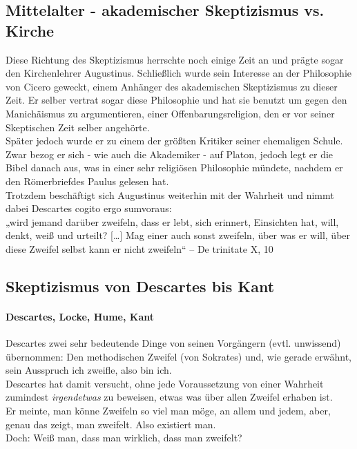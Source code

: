 \documentclass[12pt,a4paper]{article}
\begin{document}
	\subsection{Mittelalter - akademischer Skeptizismus vs. Kirche}
Diese Richtung des Skeptizismus herrschte noch einige Zeit an und prägte sogar den Kirchenlehrer Augustinus. Schließlich wurde sein Interesse an der Philosophie von Cicero geweckt, einem Anhänger des akademischen Skeptizismus zu dieser Zeit. Er selber vertrat sogar diese Philosophie und hat sie benutzt um gegen den Manichäismus zu argumentieren, einer Offenbarungsreligion, den er vor seiner Skeptischen Zeit selber angehörte.\\
Später jedoch wurde er zu einem der größten Kritiker seiner ehemaligen Schule. Zwar bezog er sich - wie auch die Akademiker - auf Platon, jedoch legt er die Bibel danach aus, was in einer sehr religiösen Philosophie mündete, nachdem er den \glqq Römerbrief\grqq des Paulus gelesen hat.\\
Trotzdem beschäftigt sich Augustinus weiterhin mit der Wahrheit und nimmt dabei Descartes \glqq cogito ergo sum\grqq voraus:\\
„wird jemand darüber zweifeln, dass er lebt, sich erinnert, Einsichten hat, will, denkt, weiß und urteilt? […] Mag einer auch sonst zweifeln, über was er will, über diese Zweifel selbst kann er nicht zweifeln“
– De trinitate X, 10%
	\subsection{Skeptizismus von Descartes bis Kant}
		\paragraph{Descartes, Locke, Hume, Kant}
Descartes zwei sehr bedeutende Dinge von seinen Vorgängern (evtl. unwissend) übernommen: Den methodischen Zweifel (von Sokrates) und, wie gerade erwähnt,  sein Ausspruch \glqq ich zweifle, also bin ich\grqq .\\
Descartes hat damit versucht, ohne jede Voraussetzung von einer Wahrheit zumindest \emph{irgendetwas} zu \glqq beweisen\grqq, etwas was über allen Zweifel erhaben ist.\\
Er meinte, man könne Zweifeln so viel man möge, an allem und jedem, aber, genau das zeigt, man zweifelt. Also existiert man.\\
Doch: Weiß man, dass man wirklich, dass man zweifelt?\\
\end{document}
